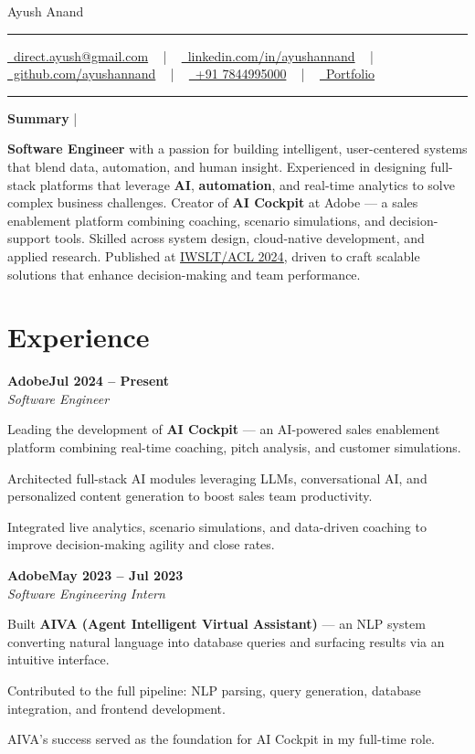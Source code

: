 \documentclass[letterpaper,10pt]{article}
\newcommand{\documentTitle}[2]{
  \begin{center}
    {\Huge\color{accentTitle} #1}
    \vspace{10pt}
    {\color{accentLine} \hrule}
    \vspace{2pt}
    \footnotesize{#2}
    \vspace{2pt}
    {\color{accentLine} \hrule}
  \end{center}
}
\newcommand{\tinysection}[1]{
  \phantomsection
  \addcontentsline{toc}{section}{#1}
  {\large{\bfseries\color{accentText}#1} {\color{accentLine} |}}
}
\newcommand{\heading}[2]{
  \hspace{10pt}#1\hfill#2\\
}
\newcommand{\headingBf}[2]{
  \heading{\textbf{#1}}{\textbf{#2}}
}
\newcommand{\headingIt}[2]{
  \heading{\textit{#1}}{\textit{#2}}
}
\newenvironment{resume_list}{
  \vspace{-7pt}
  \begin{itemize}[itemsep=-2px, parsep=1pt, leftmargin=30pt]
}{
  \end{itemize}
}
\begin{document}
  \documentTitle{Ayush Anand}{
    \href{mailto:direct.ayush@gmail.com}{\raisebox{-0.15\height} \faEnvelope\ direct.ayush@gmail.com} ~ | ~
    \href{https://linkedin.com/in/ayushannand}{\raisebox{-0.15\height} \faLinkedin\ linkedin.com/in/ayushannand} ~ | ~
    \href{https://github.com/ayushannand}{\raisebox{-0.15\height} \faGithub\ github.com/ayushannand} ~ | ~
    \href{tel:+917844995000}{\raisebox{-0.15\height} \faPhone\ +91 7844995000} ~ | ~
    \href{https://ayushannand.vercel.app/}{\raisebox{-0.15\height} \faGlobe\ Portfolio}
  }

\tinysection{Summary}

\textbf{Software Engineer} with a passion for building intelligent, user-centered systems that blend data, automation, and human insight. Experienced in designing full-stack platforms that leverage \textbf{AI}, \textbf{automation}, and real-time analytics to solve complex business challenges. Creator of \textbf{AI Cockpit} at Adobe — a sales enablement platform combining coaching, scenario simulations, and decision-support tools. Skilled across system design, cloud-native development, and applied research. Published at \underline{\href{https://aclanthology.org/2024.iwslt-1.37}{IWSLT/ACL 2024}}, driven to craft scalable solutions that enhance decision-making and team performance.

  \section{Experience}

  \headingBf{Adobe}{Jul 2024 -- Present}
  \headingIt{Software Engineer}{}
  \begin{resume_list}
    \item Leading the development of \textbf{AI Cockpit} — an AI-powered sales enablement platform combining real-time coaching, pitch analysis, and customer simulations.
    \item Architected full-stack AI modules leveraging LLMs, conversational AI, and personalized content generation to boost sales team productivity.
    \item Integrated live analytics, scenario simulations, and data-driven coaching to improve decision-making agility and close rates.
  \end{resume_list}

  \headingBf{Adobe}{May 2023 -- Jul 2023}
  \headingIt{Software Engineering Intern}{}
  \begin{resume_list}
    \item Built \textbf{AIVA (Agent Intelligent Virtual Assistant)} — an NLP system converting natural language into database queries and surfacing results via an intuitive interface.
    \item Contributed to the full pipeline: NLP parsing, query generation, database integration, and frontend development.
    \item AIVA's success served as the foundation for AI Cockpit in my full-time role.
  \end{resume_list}
\end{document}
